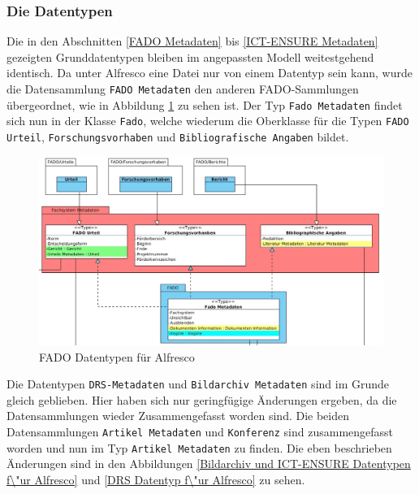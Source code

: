 \subsubsection{Die Datentypen}\label{Die Datentypen}
Die in den Abschnitten \ref{FADO Metadaten} bis \ref{ICT-ENSURE Metadaten} gezeigten Grunddatentypen bleiben im angepassten Modell weitestgehend identisch. Da unter Alfresco eine Datei nur von einem Datentyp sein kann, wurde die Datensammlung \texttt{FADO Metadaten} den anderen \ac{FADO}-Sammlungen \"ubergeordnet, wie in Abbildung \ref{Fado Datentypen f\"ur Alfresco} zu sehen ist. Der Typ \texttt{Fado Metadaten} findet sich nun in der Klasse \texttt{Fado}, welche wiederum die Oberklasse f\"ur die Typen \texttt{FADO Urteil}, \texttt{Forschungsvorhaben} und \texttt{Bibliografische Angaben} bildet.

\begin{figure}[!ht]
\centering
\includegraphics[width=16cm]{Bilder/AlfrescoModell/Fado-Datentypen.jpg}
\caption{FADO Datentypen f\"ur Alfresco}
\label{Fado Datentypen f\"ur Alfresco}
\centering
\end{figure}

Die Datentypen \texttt{DRS-Metadaten} und \texttt{Bildarchiv Metadaten} sind im Grunde gleich geblieben. Hier haben sich nur geringf\"ugige \"Anderungen ergeben, da die Datensammlungen wieder Zusammengefasst worden sind. Die beiden Datensammlungen \texttt{Artikel Metadaten} und \texttt{Konferenz} sind zusammengefasst worden und nun im Typ \texttt{Artikel Metadaten} zu finden.
Die eben beschrieben \"Anderungen sind in den Abbildungen \ref{Bildarchiv und ICT-ENSURE Datentypen f\"ur Alfresco} und \ref{DRS Datentyp f\"ur Alfresco} zu sehen.

